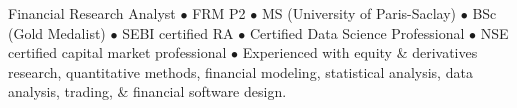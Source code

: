 \par{\vspace*{-15px}
Financial Research Analyst $\bullet$ FRM P2 $\bullet$ MS (University of Paris-Saclay) $\bullet$ BSc (Gold Medalist) $\bullet$ SEBI certified RA $\bullet$ Certified Data Science Professional $\bullet$ NSE certified capital market professional $\bullet$ Experienced with equity \& derivatives research, quantitative methods, financial modeling, statistical analysis, data analysis, trading, \& financial software design.}